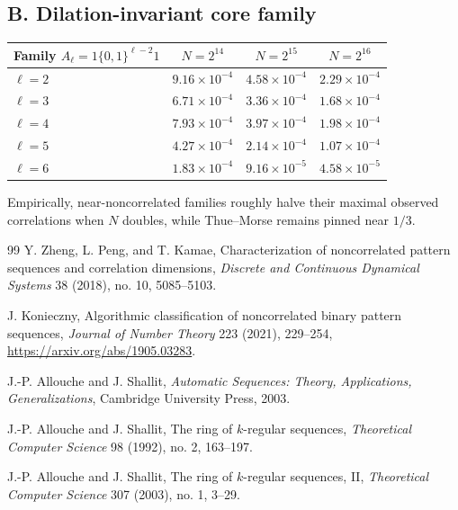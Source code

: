 \documentclass[11pt]{article}
\begin{document}
\subsection*{B. Dilation-invariant core family}
\begin{center}
\begin{tabular}{lccc}
\toprule
Family $A_\ell=1\{0,1\}^{\ell-2}1$ & $N=2^{14}$ & $N=2^{15}$ & $N=2^{16}$ \\
\midrule
$\ell=2$ & $9.16\times 10^{-4}$ & $4.58\times 10^{-4}$ & $2.29\times 10^{-4}$ \\
$\ell=3$ & $6.71\times 10^{-4}$ & $3.36\times 10^{-4}$ & $1.68\times 10^{-4}$ \\
$\ell=4$ & $7.93\times 10^{-4}$ & $3.97\times 10^{-4}$ & $1.98\times 10^{-4}$ \\
$\ell=5$ & $4.27\times 10^{-4}$ & $2.14\times 10^{-4}$ & $1.07\times 10^{-4}$ \\
$\ell=6$ & $1.83\times 10^{-4}$ & $9.16\times 10^{-5}$ & $4.58\times 10^{-5}$ \\
\bottomrule
\end{tabular}
\end{center}

Empirically, near-noncorrelated families roughly halve their maximal observed
correlations when $N$ doubles, while Thue--Morse remains pinned near $1/3$.

\begin{thebibliography}{99}
Y. Zheng, L. Peng, and T. Kamae,
\newblock Characterization of noncorrelated pattern sequences and correlation dimensions,
\newblock \emph{Discrete and Continuous Dynamical Systems} 38 (2018), no. 10, 5085--5103.

J. Konieczny,
\newblock Algorithmic classification of noncorrelated binary pattern sequences,
\newblock \emph{Journal of Number Theory} 223 (2021), 229--254,
\newblock \url{https://arxiv.org/abs/1905.03283}.

J.-P. Allouche and J. Shallit,
\newblock \emph{Automatic Sequences: Theory, Applications, Generalizations},
\newblock Cambridge University Press, 2003.

J.-P. Allouche and J. Shallit,
\newblock The ring of $k$-regular sequences,
\newblock \emph{Theoretical Computer Science} 98 (1992), no. 2, 163--197.

J.-P. Allouche and J. Shallit,
\newblock The ring of $k$-regular sequences, II,
\newblock \emph{Theoretical Computer Science} 307 (2003), no. 1, 3--29.
\end{thebibliography}
\end{document}
